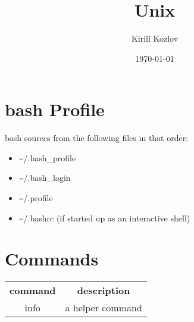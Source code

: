 \documentclass[a4paper,12pt]{article}
\begin{document}
\author{Kirill Kozlov}
\date{\today}
\title{Unix}
\maketitle

\section{bash Profile}
bash sources from the following files in that order:
\begin{itemize}
\item \~{}/.bash\_profile
\item \~{}/.bash\_login
\item \~{}/.profile
\item \~{}/.bashrc (if started up as an interactive shell)
\end{itemize}

\section{Commands}
\begin{tabular}{|c|c|}
\cline{1-2}
\textbf{command} & \textbf{description} \\
\cline{1-2}
info & a helper command \\


\end{tabular}

\newpage
\tableofcontents
\end{document}
